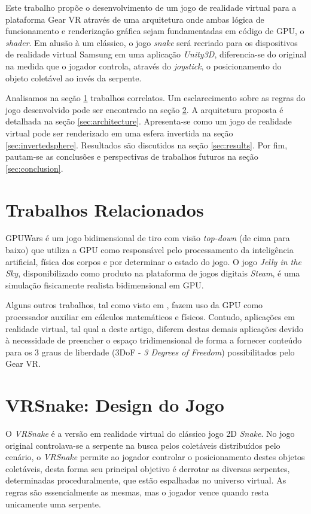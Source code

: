 \documentclass{SBCbookchapter}
\begin{document}
Este trabalho propõe o desenvolvimento de um jogo de realidade virtual para a plataforma Gear VR através de uma arquitetura onde ambas lógica de funcionamento e renderização gráfica sejam fundamentadas em código de GPU, o \textit{shader}. Em alusão à um clássico, o jogo \textit{snake} será recriado para os dispositivos de realidade virtual Samsung em uma aplicação \textit{Unity3D}, diferencia-se do original na medida que o jogador controla, através do \textit{joystick}, o posicionamento do objeto coletável ao invés da serpente.

Analisamos na seção \ref{sec:relatedworks} trabalhos correlatos. Um esclarecimento sobre as regras do jogo desenvolvido pode ser encontrado na seção \ref{sec:vrsnake}. A arquitetura proposta é detalhada na seção \ref{sec:architecture}. Apresenta-se como um jogo de realidade virtual pode ser renderizado em uma esfera invertida na seção \ref{sec:invertedsphere}. Resultados são discutidos na seção \ref{sec:results}. Por fim, pautam-se as conclusões e perspectivas de trabalhos futuros na seção \ref{sec:conclusion}.

\section{Trabalhos Relacionados} \label{sec:relatedworks}

GPUWars \cite{GPGPUWars} é um jogo bidimensional de tiro com visão \textit{top-down} (de cima para baixo) que utiliza a GPU como responsável pelo processamento da inteligência artificial, física dos corpos e por determinar o estado do jogo. O jogo \textit{Jelly in the Sky}, disponibilizado como produto na plataforma de jogos digitais \textit{Steam}, é uma simulação fisicamente realista bidimensional em GPU.

Alguns outros trabalhos, tal como visto em \cite{Joselli:2010:AGL:1658866.1658869}, fazem uso da GPU como processador auxiliar em cálculos matemáticos e físicos. Contudo, aplicações em realidade virtual, tal qual a deste artigo, diferem destas demais aplicações devido à necessidade de preencher o espaço tridimensional de forma a fornecer conteúdo para os 3 graus de liberdade (3DoF - \textit{3 Degrees of Freedom}) possibilitados pelo Gear VR.

\section{VRSnake: Design do Jogo} \label{sec:vrsnake}
O \textit{VRSnake} é a versão em realidade virtual do clássico jogo 2D \textit{Snake}. No jogo original controlava-se a serpente na busca pelos coletáveis distribuídos pelo cenário, o \textit{VRSnake} permite ao jogador controlar o posicionamento destes objetos coletáveis, desta forma seu principal objetivo é derrotar as diversas serpentes, determinadas proceduralmente, que estão espalhadas no universo virtual. As regras são essencialmente as mesmas, mas o jogador vence quando resta unicamente uma serpente.
\end{document}
